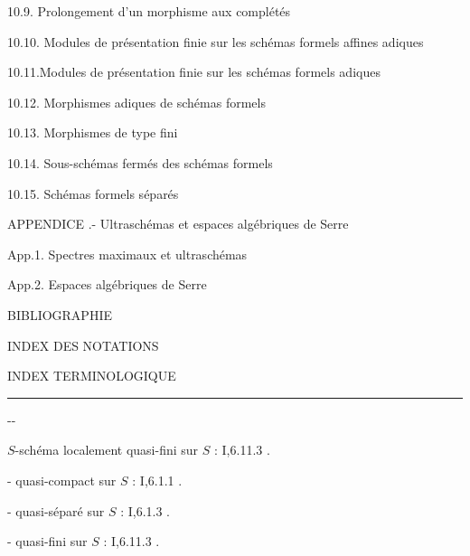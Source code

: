10.9. Prolongement d'un morphisme aux complétés\dotfill

10.10. Modules de présentation finie sur les schémas formels affines adiques\dotfill

10.11.Modules de présentation finie sur les schémas formels adiques\dotfill

10.12. Morphismes adiques de schémas formels\dotfill
{}

10.13. Morphismes de type fini\dotfill

10.14. Sous-schémas fermés des schémas formels\dotfill

10.15. Schémas formels séparés\dotfill

APPENDICE .- Ultraschémas et espaces algébriques de Serre\dotfill

App.1. Spectres maximaux et ultraschémas\dotfill

App.2. Espaces algébriques de Serre\dotfill

BIBLIOGRAPHIE\dotfill

INDEX DES NOTATIONS\dotfill

INDEX TERMINOLOGIQUE\dotfill

\begin{center}\rule{2cm}{0.4pt}\end{center}
\begin{center}-\qquad -\end{center}

$S$-schéma localement quasi-fini sur $S$ : I,6.11.3 .

- quasi-compact sur $S$ : I,6.1.1 .

- quasi-séparé sur $S$ : I,6.1.3 .

- quasi-fini sur $S$ :  I,6.11.3 .

